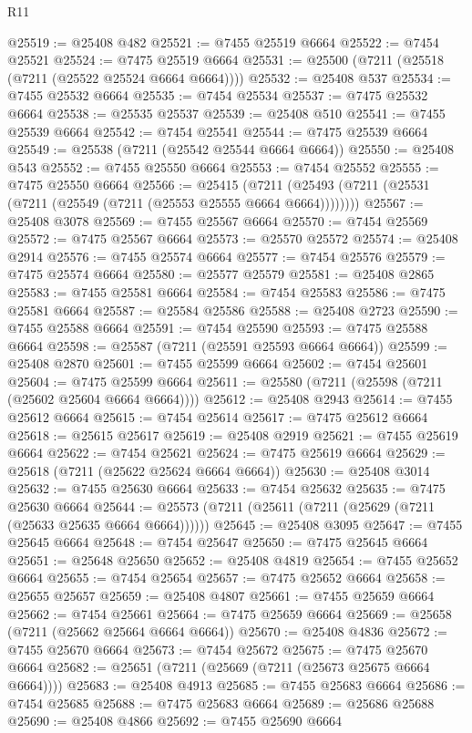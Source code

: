 \begin{lexlean}{R11}
\begin{coremodule}
{{{{{{{{{{{{{{{{{{{{{{{{{{{{{{{{{{{{{{{{{{{{{{{{{{{{{{{{{{{{{{{{{{{{{{{{{{{{{{{{{{@25519 := @25408 @482
@25521 := @7455 @25519 @6664
@25522 := @7454 @25521
@25524 := @7475 @25519 @6664
@25531 := @25500 (@7211 (@25518 (@7211 (@25522 @25524 @6664 @6664))))
@25532 := @25408 @537
@25534 := @7455 @25532 @6664
@25535 := @7454 @25534
@25537 := @7475 @25532 @6664
@25538 := @25535 @25537
@25539 := @25408 @510
@25541 := @7455 @25539 @6664
@25542 := @7454 @25541
@25544 := @7475 @25539 @6664
@25549 := @25538 (@7211 (@25542 @25544 @6664 @6664))
@25550 := @25408 @543
@25552 := @7455 @25550 @6664
@25553 := @7454 @25552
@25555 := @7475 @25550 @6664
@25566 := @25415
    (@7211 (@25493 (@7211 (@25531 (@7211 (@25549 (@7211 (@25553 @25555 @6664 @6664))))))))
@25567 := @25408 @3078
@25569 := @7455 @25567 @6664
@25570 := @7454 @25569
@25572 := @7475 @25567 @6664
@25573 := @25570 @25572
@25574 := @25408 @2914
@25576 := @7455 @25574 @6664
@25577 := @7454 @25576
@25579 := @7475 @25574 @6664
@25580 := @25577 @25579
@25581 := @25408 @2865
@25583 := @7455 @25581 @6664
@25584 := @7454 @25583
@25586 := @7475 @25581 @6664
@25587 := @25584 @25586
@25588 := @25408 @2723
@25590 := @7455 @25588 @6664
@25591 := @7454 @25590
@25593 := @7475 @25588 @6664
@25598 := @25587 (@7211 (@25591 @25593 @6664 @6664))
@25599 := @25408 @2870
@25601 := @7455 @25599 @6664
@25602 := @7454 @25601
@25604 := @7475 @25599 @6664
@25611 := @25580 (@7211 (@25598 (@7211 (@25602 @25604 @6664 @6664))))
@25612 := @25408 @2943
@25614 := @7455 @25612 @6664
@25615 := @7454 @25614
@25617 := @7475 @25612 @6664
@25618 := @25615 @25617
@25619 := @25408 @2919
@25621 := @7455 @25619 @6664
@25622 := @7454 @25621
@25624 := @7475 @25619 @6664
@25629 := @25618 (@7211 (@25622 @25624 @6664 @6664))
@25630 := @25408 @3014
@25632 := @7455 @25630 @6664
@25633 := @7454 @25632
@25635 := @7475 @25630 @6664
@25644 := @25573 (@7211 (@25611 (@7211 (@25629 (@7211 (@25633 @25635 @6664 @6664))))))
@25645 := @25408 @3095
@25647 := @7455 @25645 @6664
@25648 := @7454 @25647
@25650 := @7475 @25645 @6664
@25651 := @25648 @25650
@25652 := @25408 @4819
@25654 := @7455 @25652 @6664
@25655 := @7454 @25654
@25657 := @7475 @25652 @6664
@25658 := @25655 @25657
@25659 := @25408 @4807
@25661 := @7455 @25659 @6664
@25662 := @7454 @25661
@25664 := @7475 @25659 @6664
@25669 := @25658 (@7211 (@25662 @25664 @6664 @6664))
@25670 := @25408 @4836
@25672 := @7455 @25670 @6664
@25673 := @7454 @25672
@25675 := @7475 @25670 @6664
@25682 := @25651 (@7211 (@25669 (@7211 (@25673 @25675 @6664 @6664))))
@25683 := @25408 @4913
@25685 := @7455 @25683 @6664
@25686 := @7454 @25685
@25688 := @7475 @25683 @6664
@25689 := @25686 @25688
@25690 := @25408 @4866
@25692 := @7455 @25690 @6664
}}}}}}}}}}}}}}}}}}}}}}}}}}}}}}}}}}}}}}}}}}}}}}}}}}}}}}}}}}}}}}}}}}}}}}}}}}}}}}}}}}
\end{coremodule}
\end{lexlean}

